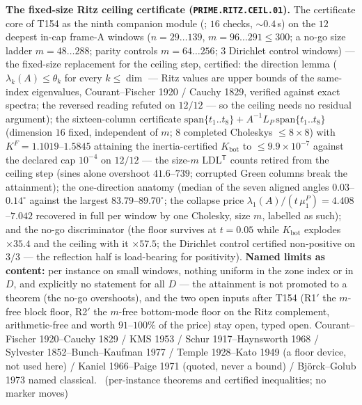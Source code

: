 \par\smallskip\noindent\textbf{The fixed-size Ritz ceiling certificate
(\texttt{PRIME.RITZ.CEIL.01}).}
The certificate core of T154 as the ninth companion module
(; $16$ checks, ${\sim}0.4$\,s)
on the $12$ deepest in-cap frame-A windows ($n=29\ldots139$,
$m=96\ldots291\le300$; a no-go size ladder $m=48\ldots288$; parity
controls $m=64\ldots256$; $3$ Dirichlet control windows) --- the
fixed-size replacement for the ceiling step, certified: the direction
lemma ($\lambda_k(A)\le\theta_k$ for every $k\le\dim$ --- Ritz values are
upper bounds of the same-index eigenvalues, Courant--Fischer 1920 /
Cauchy 1829, verified against exact spectra; the reversed reading refuted
on $12/12$ --- so the ceiling needs no residual argument); the
sixteen-column certificate
$\mathrm{span}\{t_1..t_8\}+A^{-1}L_P\,\mathrm{span}\{t_1..t_8\}$
(dimension $16$ fixed, independent of $m$; $8$ completed Choleskys
$\le8\times8$) with $K^F=1.1019$--$1.5845$ attaining the
inertia-certified $K_{\mathrm{bot}}$ to $\le9.9\times10^{-7}$ against the
declared cap $10^{-4}$ on $12/12$ --- the size-$m$ LDL$^{\mathsf T}$
counts retired from the ceiling step (sines alone overshoot
$41.6$--$739$; corrupted Green columns break the attainment); the
one-direction anatomy (median of the seven aligned angles
$0.03$--$0.14^\circ$ against the largest $83.79$--$89.70^\circ$; the
collapse price $\lambda_1(A)/(t\,\mu^P_1)=4.408$--$7.042$ recovered in
full per window by one Cholesky, size $m$, labelled as such); and the
no-go discriminator (the floor survives at $t=0.05$ while
$K_{\mathrm{bot}}$ explodes $\times35.4$ and the ceiling with it
$\times57.5$; the Dirichlet control certified non-positive on $3/3$ ---
the reflection half is load-bearing for positivity).
\textbf{Named limits as content:} per instance on small windows, nothing
uniform in the zone index or in $D$, and explicitly no statement for all
$D$ --- the attainment is not promoted to a theorem (the no-go
overshoots), and the two open inputs after T154 (R1$'$ the $m$-free block
floor, R2$'$ the $m$-free bottom-mode floor on the Ritz complement,
arithmetic-free and worth $91$--$100\%$ of the price) stay open, typed
open. Courant--Fischer 1920--Cauchy 1829 / KMS 1953 / Schur
1917--Haynsworth 1968 / Sylvester 1852--Bunch--Kaufman 1977 / Temple
1928--Kato 1949 (a floor device, not used here) / Kaniel 1966--Paige 1971
(quoted, never a bound) / Bj\"orck--Golub 1973 named classical.
\mE\ (per-instance theorems and certified inequalities; no marker moves)
\par\smallskip


